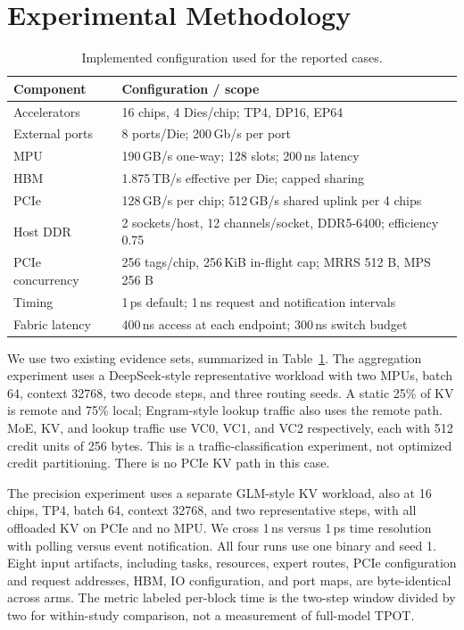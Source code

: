 \documentclass[conference]{IEEEtran}
\begin{document}




\section{Experimental Methodology}
\begin{table}[t]
\centering\caption{Implemented configuration used for the reported cases.}
\label{tab:setup}
\small
\begin{tabular}{p{}p{}}
\toprule
Component & Configuration / scope\\\midrule
Accelerators & 16 chips, 4 Dies/chip; TP4, DP16, EP64\\
External ports & 8 ports/Die; 200\,Gb/s per port\\
MPU & 190\,GB/s one-way; 128 slots; 200\,ns latency\\
HBM & 1.875\,TB/s effective per Die; capped sharing\\
PCIe & 128\,GB/s per chip; 512\,GB/s shared uplink per 4 chips\\
Host DDR & 2 sockets/host, 12 channels/socket, DDR5-6400; efficiency 0.75\\
PCIe concurrency & 256 tags/chip, 256\,KiB in-flight cap; MRRS 512 B, MPS 256 B\\
Timing & 1\,ps default; 1\,ns request and notification intervals\\
Fabric latency & 400\,ns access at each endpoint; 300\,ns switch budget\\
\bottomrule
\end{tabular}
\end{table}

We use two existing evidence sets, summarized in Table~\ref{tab:setup}. The aggregation experiment uses a DeepSeek-style representative workload with two MPUs, batch 64, context 32768, two decode steps, and three routing seeds. A static 25\% of KV is remote and 75\% local; Engram-style lookup traffic also uses the remote path. MoE, KV, and lookup traffic use VC0, VC1, and VC2 respectively, each with 512 credit units of 256 bytes. This is a traffic-classification experiment, not optimized credit partitioning. There is no PCIe KV path in this case.

The precision experiment uses a separate GLM-style KV workload, also at 16 chips, TP4, batch 64, context 32768, and two representative steps, with all offloaded KV on PCIe and no MPU. We cross 1\,ns versus 1\,ps time resolution with polling versus event notification. All four runs use one binary and seed 1. Eight input artifacts, including tasks, resources, expert routes, PCIe configuration and request addresses, HBM, IO configuration, and port maps, are byte-identical across arms. The metric labeled per-block time is the two-step window divided by two for within-study comparison, not a measurement of full-model TPOT.
\end{document}
